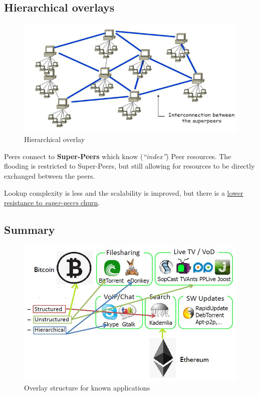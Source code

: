 \subsection{Hierarchical overlays}
\begin{paracol}{2}
   
   \begin{figure}[htbp]
      \centering
      \includegraphics{images/hierarchical_overlay.png}
      \caption{Hierarchical overlay}
   \label{fig:hierarchical_overlay}
\end{figure}

\switchcolumn

Peers connect to \textbf{Super-Peers} which know (\textit{``index''}) Peer resources.
The flooding is restricted to Super-Peers, but still allowing for resources to be directly exchanged between the peers.

Lookup complexity is less and the scalability is improved, but there is a \ul{lower resistance to \textit{super-peers} churn}.


\end{paracol}
\subsection{Summary}
\begin{figure}[htbp]
   \centering
   \includegraphics{images/overlays_applications.png}
   \caption{Overlay structure for known applications}
   \label{fig:overlays_applications}
\end{figure}

